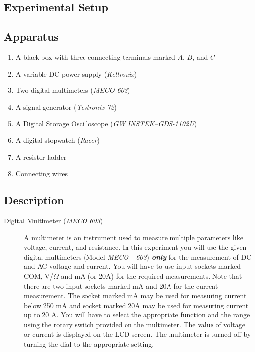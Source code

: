 \begin{refsection}
\section*{Experimental Setup}

\subsection*{Apparatus}

\begin{enumerate}
\item A black box with three connecting terminals marked $A$, $B$, and $C$
\item A variable DC power supply (\textit{Keltronix})
\item Two digital multimeters (\textit{MECO 603})
\item A signal generator (\textit{Testronix 72})
\item A Digital Storage Oscilloscope (\textit{GW INSTEK–GDS-1102U})
\item A digital stopwatch (\textit{Racer})
\item A resistor ladder
\item Connecting wires

\end{enumerate}

\subsection*{Description}

\begin{description}
\item[Digital Multimeter (\textit{MECO 603})]

A multimeter is an instrument used to measure multiple parameters like voltage, current, and resistance. In this experiment you will use the given digital multimeters (Model \textit{MECO - 603}) \textbf{\textit{only}} for the measurement of DC and AC voltage and current. You will have to use input sockets marked COM, V/$\Omega$ and mA (or 20A) for the required measurements. Note that there are two input sockets marked mA and 20A for the current measurement. The socket marked mA may be used for measuring current below 250 mA and socket marked 20A may be used for measuring current up to 20 A. You will have to select the appropriate function and the range using the rotary switch provided on the multimeter. The value of voltage or current is displayed on the LCD screen. The multimeter is turned off by turning the dial to the appropriate setting.


\end{description}
\end{refsection}
